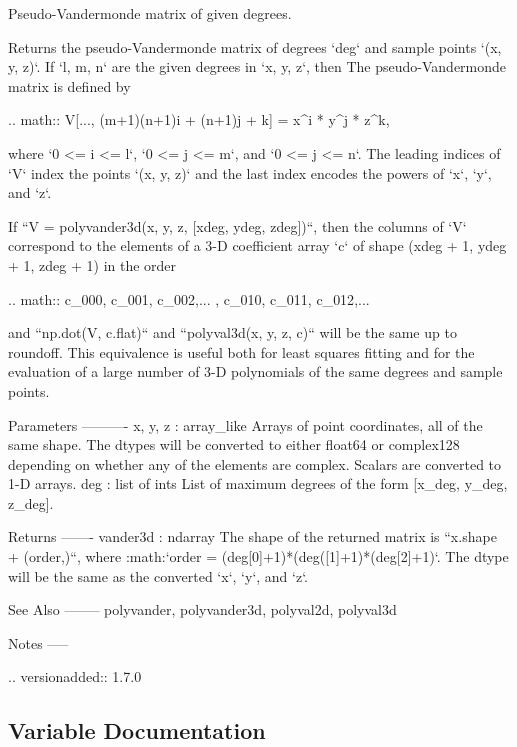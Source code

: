 \begin{DoxyVerb}Pseudo-Vandermonde matrix of given degrees.

Returns the pseudo-Vandermonde matrix of degrees `deg` and sample
points `(x, y, z)`. If `l, m, n` are the given degrees in `x, y, z`,
then The pseudo-Vandermonde matrix is defined by

.. math:: V[..., (m+1)(n+1)i + (n+1)j + k] = x^i * y^j * z^k,

where `0 <= i <= l`, `0 <= j <= m`, and `0 <= j <= n`.  The leading
indices of `V` index the points `(x, y, z)` and the last index encodes
the powers of `x`, `y`, and `z`.

If ``V = polyvander3d(x, y, z, [xdeg, ydeg, zdeg])``, then the columns
of `V` correspond to the elements of a 3-D coefficient array `c` of
shape (xdeg + 1, ydeg + 1, zdeg + 1) in the order

.. math:: c_{000}, c_{001}, c_{002},... , c_{010}, c_{011}, c_{012},...

and  ``np.dot(V, c.flat)`` and ``polyval3d(x, y, z, c)`` will be the
same up to roundoff. This equivalence is useful both for least squares
fitting and for the evaluation of a large number of 3-D polynomials
of the same degrees and sample points.

Parameters
----------
x, y, z : array_like
    Arrays of point coordinates, all of the same shape. The dtypes will
    be converted to either float64 or complex128 depending on whether
    any of the elements are complex. Scalars are converted to 1-D
    arrays.
deg : list of ints
    List of maximum degrees of the form [x_deg, y_deg, z_deg].

Returns
-------
vander3d : ndarray
    The shape of the returned matrix is ``x.shape + (order,)``, where
    :math:`order = (deg[0]+1)*(deg([1]+1)*(deg[2]+1)`.  The dtype will
    be the same as the converted `x`, `y`, and `z`.

See Also
--------
polyvander, polyvander3d, polyval2d, polyval3d

Notes
-----

.. versionadded:: 1.7.0\end{DoxyVerb}
 

\subsection{Variable Documentation}
\mbox{\label{namespacenumpy_1_1polynomial_1_1polynomial_a7a119d1b65932bf329ae2b46feb15f91}} 
